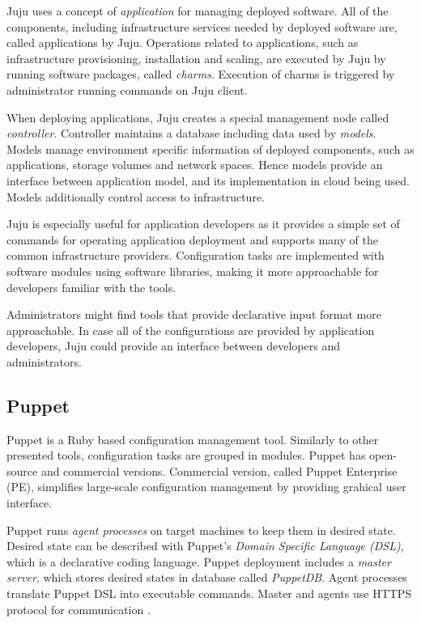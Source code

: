 \documentclass[officiallayout]{tktla}
\begin{document}
Juju uses a concept of \textit{application} for managing deployed software. All
of the components, including infrastructure services needed by deployed
software are, called applications by Juju. Operations related to applications,
such as infrastructure provisioning, installation and scaling, are executed by
Juju by running software packages, called \textit{charms}. Execution of charms
is triggered by administrator running commands on Juju client.

When deploying applications, Juju creates a special management node called
\textit{controller}. Controller maintains a database including data used by
\textit{models}. Models manage environment specific information of deployed
components, such as applications, storage volumes and network spaces. Hence
models provide an interface between application model, and its implementation
in cloud being used. Models additionally control access to infrastructure.

Juju is especially useful for application developers as it provides a simple
set of commands for operating application deployment and supports many of the
common infrastructure providers. Configuration tasks are implemented with
software modules using software libraries, making it more approachable for
developers familiar with the tools.

Administrators might find tools that provide declarative input format more
approachable. In case all of the configurations are provided by application
developers, Juju could provide an interface between developers and
administrators.

\subsection{Puppet}

Puppet \cite{puppet} is a Ruby based configuration management tool. Similarly
to other presented tools, configuration tasks are grouped in modules. Puppet
has open-source and commercial versions. Commercial version, called Puppet
Enterprise (PE), simplifies large-scale configuration management by providing
grahical user interface.

Puppet runs \textit{agent processes} on target machines to keep them in desired
state. Desired state can be described with Puppet's \textit{Domain Specific
Language (DSL)}, which is a declarative coding language. Puppet deployment
includes a \textit{master server}, which stores desired states in database
called \textit{PuppetDB}. Agent processes translate Puppet DSL into executable
commands. Master and agents use HTTPS protocol for communication \cite{puppet}.
\end{document}
